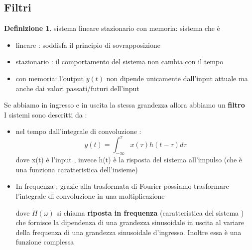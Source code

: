 \documentclass{article}
\theoremstyle{definition}
\newtheorem*{definizione}{Definizione}
\begin{document}
\subsection{Filtri}
\begin{definizione}
sistema lineare stazionario con memoria: sistema che è \begin{itemize}
\item lineare : soddisfa il principio di sovrapposizione 
\item stazionario : il comportamento del sistema non cambia con il tempo 
\item con memoria: l'output $y(t)$ non dipende unicamente dall'input attuale ma anche dai valori passati/futuri dell'input 
\end{itemize}
\end{definizione}
Se abbiamo in ingresso e in uscita la stessa grandezza allora abbiamo un \textbf{filtro}\\
I sistemi sono descritti da : 
\begin{itemize}
	\item nel tempo dall'integrale di convoluzione :
	$$y(t)=\int_{-\infty}^{\tau}x(\tau)h(t-\tau)d\tau$$
	dove x(t) è l'input , invece h(t) è la risposta del sistema all'impulso (che è una funziona caratteristica dell'insieme)
	\item In frequenza : grazie alla trasformata di Fourier possiamo trasformare l'integrale di convoluzione in una moltiplicazione
	\begin{center}
        \label{risposta in frequenza}
	\end{center}
    
	dove $\dot{H}(\omega)$ si chiama\textbf{ riposta in frequenza} (caratteristica del sistema )  che fornisce la dipendenza di una grandezza sinusoidale in uscita al variare della frequenza di una grandezza sinusoidale d'ingresso. Inoltre essa è una funzione complessa
\end{itemize}
\end{document}
